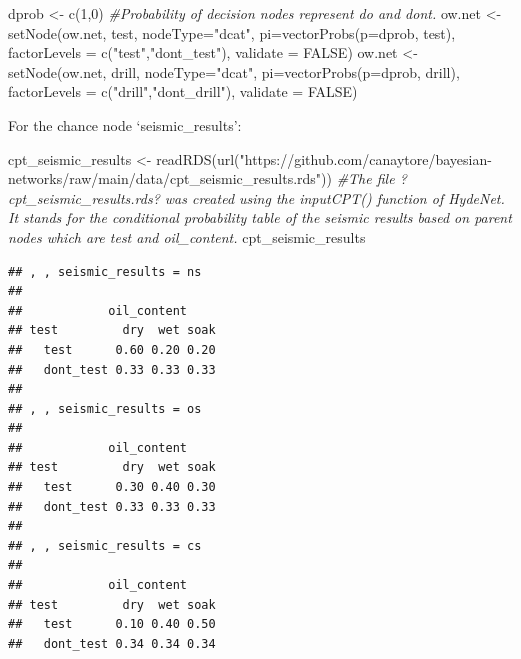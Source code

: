 \documentclass[
]{article}
\newenvironment{Shaded}{\begin{snugshade}}{\end{snugshade}}
\newcommand{\AttributeTok}[1]{\textcolor[rgb]{0.77,0.63,0.00}{#1}}
\newcommand{\CommentTok}[1]{\textcolor[rgb]{0.56,0.35,0.01}{\textit{#1}}}
\newcommand{\ConstantTok}[1]{\textcolor[rgb]{0.00,0.00,0.00}{#1}}
\newcommand{\DecValTok}[1]{\textcolor[rgb]{0.00,0.00,0.81}{#1}}
\newcommand{\FunctionTok}[1]{\textcolor[rgb]{0.00,0.00,0.00}{#1}}
\newcommand{\NormalTok}[1]{#1}
\newcommand{\OtherTok}[1]{\textcolor[rgb]{0.56,0.35,0.01}{#1}}
\newcommand{\StringTok}[1]{\textcolor[rgb]{0.31,0.60,0.02}{#1}}
\begin{document}
\begin{Shaded}
\begin{Highlighting}[]
\NormalTok{dprob }\OtherTok{\textless{}{-}} \FunctionTok{c}\NormalTok{(}\DecValTok{1}\NormalTok{,}\DecValTok{0}\NormalTok{) }\CommentTok{\#Probability of decision nodes represent do and don\textquotesingle{}t.}
\NormalTok{ow.net }\OtherTok{\textless{}{-}} \FunctionTok{setNode}\NormalTok{(ow.net, test, }\AttributeTok{nodeType=}\StringTok{"dcat"}\NormalTok{, }\AttributeTok{pi=}\FunctionTok{vectorProbs}\NormalTok{(}\AttributeTok{p=}\NormalTok{dprob, test), }\AttributeTok{factorLevels =} \FunctionTok{c}\NormalTok{(}\StringTok{"test"}\NormalTok{,}\StringTok{"dont\_test"}\NormalTok{), }\AttributeTok{validate =} \ConstantTok{FALSE}\NormalTok{)}
\NormalTok{ow.net }\OtherTok{\textless{}{-}} \FunctionTok{setNode}\NormalTok{(ow.net, drill, }\AttributeTok{nodeType=}\StringTok{"dcat"}\NormalTok{, }\AttributeTok{pi=}\FunctionTok{vectorProbs}\NormalTok{(}\AttributeTok{p=}\NormalTok{dprob, drill), }\AttributeTok{factorLevels =} \FunctionTok{c}\NormalTok{(}\StringTok{"drill"}\NormalTok{,}\StringTok{"dont\_drill"}\NormalTok{), }\AttributeTok{validate =} \ConstantTok{FALSE}\NormalTok{)}
\end{Highlighting}
\end{Shaded}

For the chance node `seismic\_results':

\begin{Shaded}
\begin{Highlighting}[]
\NormalTok{cpt\_seismic\_results }\OtherTok{\textless{}{-}} \FunctionTok{readRDS}\NormalTok{(}\FunctionTok{url}\NormalTok{(}\StringTok{"https://github.com/canaytore/bayesian{-}networks/raw/main/data/cpt\_seismic\_results.rds"}\NormalTok{))}
\CommentTok{\#The file ?cpt\_seismic\_results.rds? was created using the inputCPT() function of HydeNet. It stands for the conditional probability table of the seismic results based on parent nodes which are \textquotesingle{}test\textquotesingle{} and \textquotesingle{}oil\_content\textquotesingle{}.}
\NormalTok{cpt\_seismic\_results}
\end{Highlighting}
\end{Shaded}

\begin{verbatim}
## , , seismic_results = ns
## 
##            oil_content
## test         dry  wet soak
##   test      0.60 0.20 0.20
##   dont_test 0.33 0.33 0.33
## 
## , , seismic_results = os
## 
##            oil_content
## test         dry  wet soak
##   test      0.30 0.40 0.30
##   dont_test 0.33 0.33 0.33
## 
## , , seismic_results = cs
## 
##            oil_content
## test         dry  wet soak
##   test      0.10 0.40 0.50
##   dont_test 0.34 0.34 0.34
\end{verbatim}
\end{document}
